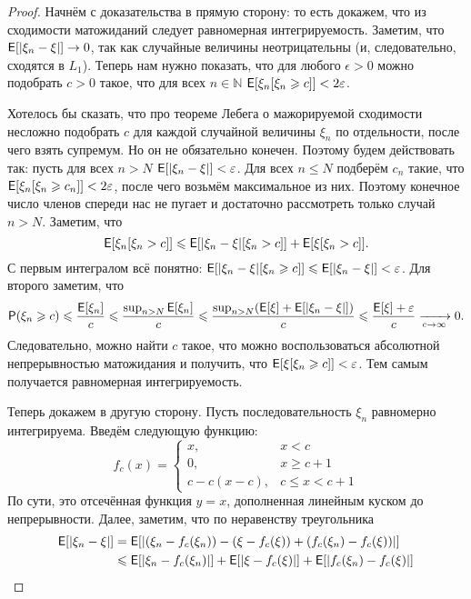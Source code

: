 \begin{proof}
    Начнём с доказательства в прямую сторону: то есть докажем, что из сходимости матожиданий следует равномерная интегрируемость. Заметим, что $\operatorname{\mathsf{E}}[|\xi_{n} - \xi|] \to 0$, так как случайные величины неотрицательны (и, следовательно, сходятся в $L_{1}$). Теперь нам нужно показать, что для любого $\epsilon > 0$ можно подобрать $c > 0$ такое, что для всех $n \in \mathbb{N}$ $\operatorname{\mathsf{E}}[\xi_{n}[\xi_{n} \geqslant c]] < 2\varepsilon$.
    
    Хотелось бы сказать, что про теореме Лебега о мажорируемой сходимости несложно подобрать $c$ для каждой случайной величины $\xi_{n}$ по отдельности, после чего взять супремум. Но он не обязательно конечен. Поэтому будем действовать так: пусть для всех $n > N$ $\operatorname{\mathsf{E}}[|\xi_{n} - \xi|] < \varepsilon$. Для всех $n \leq N$ подберём $c_{n}$ такие, что $\operatorname{\mathsf{E}}[\xi_{n}[\xi_{n} \geqslant c_{n}]] < 2\varepsilon$, после чего возьмём максимальное из них. Поэтому конечное число членов спереди нас не пугает и достаточно рассмотреть только случай $n > N$. Заметим, что
    \[
        \operatorname{\mathsf{E}}[\xi_{n}[\xi_{n} > c]] \leqslant \operatorname{\mathsf{E}}[|\xi_{n} - \xi|[\xi_{n} > c]] + \operatorname{\mathsf{E}}[\xi[\xi_{n} > c]].
    \]
    С первым интегралом всё понятно: $\operatorname{\mathsf{E}}[|\xi_{n} - \xi|[\xi_{n} \geqslant c]] \leqslant \operatorname{\mathsf{E}}[|\xi_{n} - \xi|] < \varepsilon$. Для второго заметим, что
    \[
        \mathsf{P}(\xi_{n} \geqslant c) \leqslant \frac{\operatorname{\mathsf{E}}[\xi_{n}]}{c} \leqslant \frac{\sup_{n > N}\operatorname{\mathsf{E}}[\xi_{n}]}{c} \leqslant \frac{\sup_{n > N}(\operatorname{\mathsf{E}}[\xi] + \operatorname{\mathsf{E}}[|\xi_{n} - \xi|])}{c} \leqslant \frac{\operatorname{\mathsf{E}}[\xi] + \varepsilon}{c} \xrightarrow[c \to \infty]{} 0.
    \]
    Следовательно, можно найти $c$ такое, что можно воспользоваться абсолютной непрерывностью матожидания и получить, что $\operatorname{\mathsf{E}}[\xi[\xi_{n} \geqslant c]] < \varepsilon$. Тем самым получается равномерная интегрируемость.
    
    Теперь докажем в другую сторону. Пусть последовательность $\xi_{n}$ равномерно интегрируема. Введём следующую функцию:
    \[
        f_{c}(x) = \begin{cases}
        x, & x < c \\
        0, & x \geq c + 1 \\
        c - c(x - c), & c \leq x < c + 1
        \end{cases}
    \]
    По сути, это отсечённая функция $y = x$, дополненная линейным куском до непрерывности. Далее, заметим, что по неравенству треугольника
    \begin{align*}
        \operatorname{\mathsf{E}}[|\xi_{n} - \xi|] 
        &= \operatorname{\mathsf{E}}[|(\xi_{n} - f_{c}(\xi_{n})) - (\xi - f_{c}(\xi)) + (f_{c}(\xi_{n}) - f_{c}(\xi))|] \\
        &\leqslant \operatorname{\mathsf{E}}[|\xi_{n} - f_{c}(\xi_{n})|] + \operatorname{\mathsf{E}}[|\xi - f_{c}(\xi)|] + \operatorname{\mathsf{E}}[|f_{c}(\xi_{n}) - f_{c}(\xi)|]
    \end{align*}
    

\end{proof}
